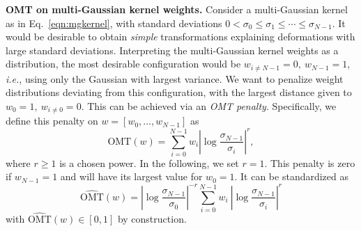 \documentclass[10pt,twocolumn,letterpaper,table]{article}
\numberwithin{equation}{section}
\theoremstyle{plain}
\theoremstyle{definition}
\let\on=\operatorname
\def\ie{\emph{i.e.}}  \def\Ie{\emph{I.e.}}
\begin{document}
\noindent
\textbf{OMT on multi-Gaussian kernel weights.}
Consider a multi-Gaussian kernel as in Eq.~\eqref{eqn:mgkernel}, with standard deviations $0<\sigma_0\leq \sigma_1 \leq \cdots \leq \sigma_{N-1}$. It would be desirable to obtain \emph{simple} transformations explaining deformations with large standard deviations. Interpreting the multi-Gaussian kernel weights as a distribution, the most desirable configuration would be $w_{i\neq N-1}=0,~w_{N-1}=1$, \ie, using only the Gaussian with largest variance. We want to penalize weight distributions deviating from this configuration, with the largest distance given to $w_0=1,~w_{i\neq 0}=0$. This can be achieved via an \emph{OMT penalty}. Specifically, we define this penalty on $w=[w_0,\ldots,w_{N-1}]$ as
\begin{equation}
  \text{OMT}(w) = \sum_{i=0}^{N-1}w_i\left|\log\frac{\sigma_{N-1}}{\sigma_i}\right|^r ,
\label{eqn:omtw}
\end{equation}
where $r\geq 1$ is a chosen power. In the following, we set $r=1$. This penalty is zero if $w_{N-1}=1$ and will have its largest value for $w_0=1$. It can be standardized as
\begin{equation}
  \widehat{\text{OMT}}(w) = \left|\log\frac{\sigma_{N-1}}{\sigma_0}\right|^{-r}\sum_{i=0}^{N-1}w_i\ \left|\log\frac{\sigma_{N-1}}{\sigma_i}\right|^r
\end{equation}
with $\widehat{\text{OMT}}(w)\in[0,1]$ by construction. 
\let\on=\operatorname
\end{document}
